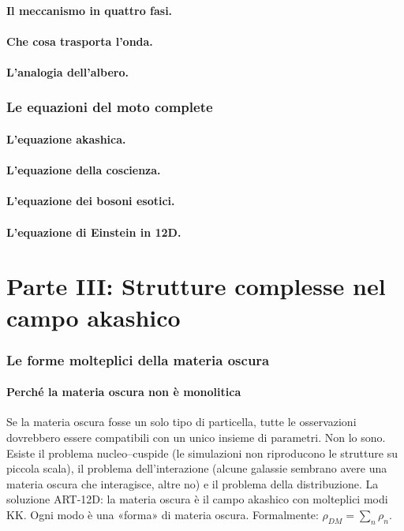 \documentclass[11pt,a4paper]{article}
\begin{document}
\subsection{Il meccanismo in quattro fasi.}
\subsection{Che cosa trasporta l'onda.}
\subsection{L'analogia dell'albero.}

\section{Le equazioni del moto complete}
\subsection{L'equazione akashica.}
\subsection{L'equazione della coscienza.}
\subsection{L'equazione dei bosoni esotici.}
\subsection{L'equazione di Einstein in 12D.}

\newpage
\part*{Parte III: Strutture complesse nel campo akashico}

\section{Le forme molteplici della materia oscura}
\subsection{Perché la materia oscura non è monolitica}
Se la materia oscura fosse un solo tipo di particella, tutte le osservazioni dovrebbero essere compatibili con un unico insieme di parametri. Non lo sono. Esiste il problema nucleo--cuspide (le simulazioni non riproducono le strutture su piccola scala), il problema dell'interazione (alcune galassie sembrano avere una materia oscura che interagisce, altre no) e il problema della distribuzione. La soluzione ART-12D: la materia oscura è il campo akashico con molteplici modi KK. Ogni modo è una «forma» di materia oscura. Formalmente: $\rho_{DM} = \sum_n \rho_n$.
\end{document}
